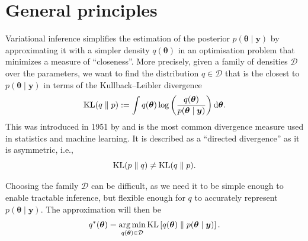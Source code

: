 \documentclass[a4paper, 11pt]{report}
\numberwithin{equation}{chapter}
\DeclareMathOperator*{\argmin}{arg\,min}
\DeclareMathOperator*{\KL}{{\rm KL}}
\begin{document}
\section{General principles} \label{sec:gen_princ}
Variational inference simplifies the estimation of the posterior $p(\boldsymbol{\theta}\mid \boldsymbol{y})$ by approximating it with a simpler density $q(\boldsymbol{\theta})$ in an optimisation problem that minimizes a measure of ``closeness''. More precisely, given a family of densities $\mathcal{D}$ over the parameters, we want to find the distribution \mbox{$q \in \mathcal{D}$} that is the closest to $p(\boldsymbol{\theta} \mid \boldsymbol{y})$ in terms of the Kullback--Leibler divergence
\begin{equation*}
\KL(q\parallel p) := \int q(\boldsymbol{\theta})\log \left(\frac{q(\boldsymbol{\theta})}{p(\boldsymbol{\theta} \mid \boldsymbol{y})}\right) \mathrm{d}\boldsymbol{\theta}.
\end{equation*} 
This was introduced in 1951 by \citet{kl51} and is the most common divergence measure used in statistics and machine learning. It is described as a ``directed divergence'' as it is asymmetric, i.e.,
$$
\KL(p\parallel q) \neq \KL(q \parallel p).
$$

Choosing the family $\mathcal{D}$ can be difficult, as we need it to be simple enough to enable tractable inference, but flexible enough for $q$ to accurately represent $p(\boldsymbol{\theta} \mid \boldsymbol{y})$. The approximation will then be
\begin{equation*}
q^*(\boldsymbol{\theta} ) = \argmin_{q(\boldsymbol{\theta}) \in \mathcal{D}} \KL\left[ q(\boldsymbol{\theta}) \parallel p(\boldsymbol{\theta} \mid \boldsymbol{y})\right].
\end{equation*}
\end{document}

